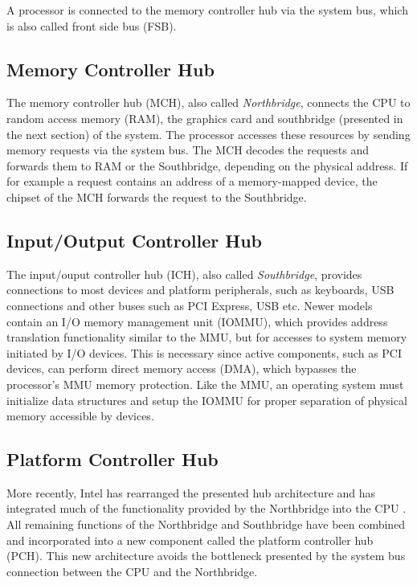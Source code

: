 A processor is connected to the memory controller hub via the system bus, which
is also called front side bus (FSB).

\subsection{Memory Controller Hub}
The memory controller hub (MCH), also called \emph{Northbridge},
connects the CPU to random access memory (RAM), the graphics card and
southbridge (presented in the next section) of the system. The processor
accesses these resources by sending memory requests via the system bus. The MCH
decodes the requests and forwards them to RAM or the Southbridge, depending on
the physical address. If for example a request contains an address of a
memory-mapped device, the chipset of the MCH forwards the request to the
Southbridge.

\subsection{Input/Output Controller Hub}
The input/ouput controller hub (ICH), also called \emph{Southbridge}, provides
connections to most devices and platform peripherals, such as keyboards, USB
connections and other buses such as PCI Express, USB etc. Newer models contain
an I/O memory management unit (IOMMU), which provides address translation
functionality similar to the MMU, but for accesses to system memory initiated by
I/O devices. This is necessary since active components, such as PCI devices, can
perform direct memory access (DMA), which bypasses the processor's
MMU memory protection. Like the MMU, an operating system must initialize data
structures and setup the IOMMU for proper separation of physical memory
accessible by devices.

\subsection{Platform Controller Hub}
More recently, Intel has rearranged the presented hub architecture and has
integrated much of the functionality provided by the Northbridge into the CPU
\cite{IntelQPI}. All remaining functions of the Northbridge and Southbridge have
been combined and incorporated into a new component called the platform
controller hub (PCH). This new architecture avoids the bottleneck
presented by the system bus connection between the CPU and the Northbridge.

